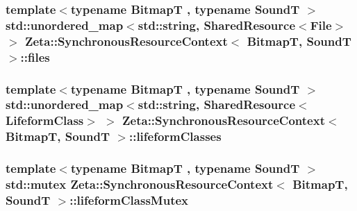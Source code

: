 \hypertarget{classZeta_1_1SynchronousResourceContext_a5d64c2516174f662c56ab56132bb2260}{
\subsubsection[{files}]{\setlength{\rightskip}{0pt plus 5cm}template$<$typename Bitmap\+T , typename Sound\+T $>$ std\+::unordered\+\_\+map$<$std\+::string, {\bf Shared\+Resource}$<${\bf File}$>$ $>$ {\bf Zeta\+::\+Synchronous\+Resource\+Context}$<$ Bitmap\+T, Sound\+T $>$\+::files\hspace{0.3cm}{\ttfamily [private]}}}\label{classZeta_1_1SynchronousResourceContext_a5d64c2516174f662c56ab56132bb2260}
\hypertarget{classZeta_1_1SynchronousResourceContext_af6a05268e24c8652866d5c324e3b13df}{
\subsubsection[{lifeform\+Classes}]{\setlength{\rightskip}{0pt plus 5cm}template$<$typename Bitmap\+T , typename Sound\+T $>$ std\+::unordered\+\_\+map$<$std\+::string, {\bf Shared\+Resource}$<${\bf Lifeform\+Class}$>$ $>$ {\bf Zeta\+::\+Synchronous\+Resource\+Context}$<$ Bitmap\+T, Sound\+T $>$\+::lifeform\+Classes\hspace{0.3cm}{\ttfamily [private]}}}\label{classZeta_1_1SynchronousResourceContext_af6a05268e24c8652866d5c324e3b13df}
\hypertarget{classZeta_1_1SynchronousResourceContext_aca2297e03ae27fb38aee8d4a3e5ab2b2}{
\subsubsection[{lifeform\+Class\+Mutex}]{\setlength{\rightskip}{0pt plus 5cm}template$<$typename Bitmap\+T , typename Sound\+T $>$ std\+::mutex {\bf Zeta\+::\+Synchronous\+Resource\+Context}$<$ Bitmap\+T, Sound\+T $>$\+::lifeform\+Class\+Mutex\hspace{0.3cm}{\ttfamily [private]}}}\label{classZeta_1_1SynchronousResourceContext_aca2297e03ae27fb38aee8d4a3e5ab2b2}
